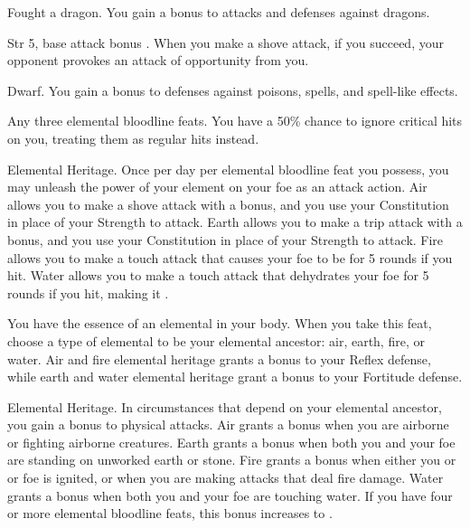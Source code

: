 \featpre Fought a dragon.
\featben You gain a  bonus to attacks and defenses against dragons.
\featspecial \featbanenotes

\featpre Str 5, base attack bonus .
\featben When you make a shove attack, if you succeed, your opponent provokes an attack of opportunity from you.

 Dwarf.
 You gain a  bonus to defenses against poisons, spells, and spell-like effects.

\featpre Any three elemental bloodline feats.
\featben You have a 50\% chance to ignore critical hits on you, treating them as regular hits instead.

\featpre Elemental Heritage.
\featben Once per day per elemental bloodline feat you possess, you may unleash the power of your element on your foe as an attack action. Air allows you to make a shove attack with a  bonus, and you use your Constitution in place of your Strength to attack. Earth allows you to make a trip attack with a  bonus, and you use your Constitution in place of your Strength to attack. Fire allows you to make a touch attack that causes your foe to be \ignited for 5 rounds if you hit. Water allows you to make a touch attack that dehydrates your foe for 5 rounds if you hit, making it \vulnerable.

\featben You have the essence of an elemental in your body. When you take this feat, choose a type of elemental to be your elemental ancestor: air, earth, fire, or water. Air and fire elemental heritage grants a  bonus to your Reflex defense, while earth and water elemental heritage grant a  bonus to your Fortitude defense.

\featpre Elemental Heritage.
\featben In circumstances that depend on your elemental ancestor, you gain a  bonus to physical attacks. Air grants a bonus when you are airborne or fighting airborne creatures. Earth grants a bonus when both you and your foe are standing on unworked earth or stone. Fire grants a bonus when either you or or foe is ignited, or when you are making attacks that deal fire damage. Water grants a bonus when both you and your foe are touching water. If you have four or more elemental bloodline feats, this bonus increases to .

